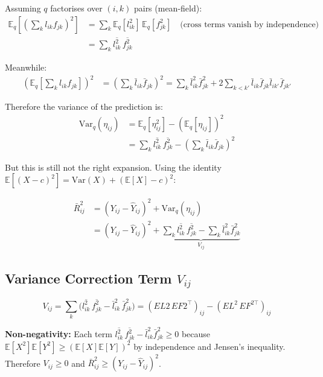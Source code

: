 \documentclass[11pt]{article}
\newcommand{\lbar}[2]{\bar{l}_{#1#2}}
\newcommand{\fbar}[2]{\bar{f}_{#1#2}}
\newcommand{\lsec}[2]{\overline{l^2_{#1#2}}}
\newcommand{\fsec}[2]{\overline{f^2_{#1#2}}}
\begin{document}
\begin{derivbox}
Assuming $q$ factorises over $(i,k)$ pairs (mean-field):
\begin{align*}
  \mathbb{E}_q\!\left[\left(\sum_k l_{ik}f_{jk}\right)^2\right]
  &= \sum_k\mathbb{E}_q[l_{ik}^2]\,\mathbb{E}_q[f_{jk}^2]
  \quad\text{(cross terms vanish by independence)}\\
  &= \sum_k\lsec{i}{k}\,\fsec{j}{k}
\end{align*}

Meanwhile:
\begin{align*}
  \left(\mathbb{E}_q\!\left[\sum_k l_{ik}f_{jk}\right]\right)^2
  &= \left(\sum_k\lbar{i}{k}\fbar{j}{k}\right)^2
  = \sum_k\lbar{i}{k}^2\fbar{j}{k}^2
    + 2\sum_{k<k'}\lbar{i}{k}\fbar{j}{k}\lbar{i}{k'}\fbar{j}{k'}
\end{align*}

Therefore the variance of the prediction is:
\begin{align}
  \mathrm{Var}_q(\eta_{ij})
  &= \mathbb{E}_q[\eta_{ij}^2] - (\mathbb{E}_q[\eta_{ij}])^2
  \nonumber\\
  &= \sum_k\lsec{i}{k}\,\fsec{j}{k}
     - \left(\sum_k\lbar{i}{k}\fbar{j}{k}\right)^2
  \label{eq:var-pred}
\end{align}

But this is still not the right expansion.  Using the identity
$\mathbb{E}[(X-c)^2] = \mathrm{Var}(X) + (\mathbb{E}[X]-c)^2$:

\begin{align}
  \bar{R}^2_{ij}
  &= (Y_{ij} - \hat{Y}_{ij})^2 + \mathrm{Var}_q(\eta_{ij})
  \nonumber\\
  &= (Y_{ij} - \hat{Y}_{ij})^2
     + \underbrace{\sum_k\lsec{i}{k}\,\fsec{j}{k}
       - \sum_k\lbar{i}{k}^2\fbar{j}{k}^2}_{V_{ij}}
  \label{eq:r2bar-final}
\end{align}
\end{derivbox}

\subsection{Variance Correction Term $V_{ij}$}

\begin{equation}
  \boxed{V_{ij} = \sum_k \bigl(\lsec{i}{k}\,\fsec{j}{k}
                              - \lbar{i}{k}^2\,\fbar{j}{k}^2\bigr)
  = (EL2\,EF2^\top)_{ij} - (EL^2\,EF^{2\top})_{ij}}
  \label{eq:var-term}
\end{equation}

\textbf{Non-negativity:} Each term $\lsec{i}{k}\,\fsec{j}{k} - \lbar{i}{k}^2\fbar{j}{k}^2 \geq 0$
because $\mathbb{E}[X^2]\mathbb{E}[Y^2] \geq (\mathbb{E}[X]\mathbb{E}[Y])^2$ by
independence and Jensen's inequality.  Therefore $V_{ij} \geq 0$ and
$\bar{R}^2_{ij} \geq (Y_{ij}-\hat{Y}_{ij})^2$.
\end{document}
